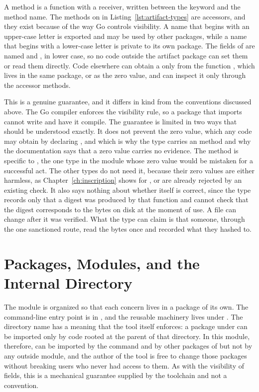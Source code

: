 A method is a function with a receiver, written between the keyword  and the method name. The methods on  in Listing~\ref{lst:artifact-types} are accessors, and they exist because of the way Go controls visibility. A name that begins with an upper-case letter is exported and may be used by other packages, while a name that begins with a lower-case letter is private to its own package. The fields of  are named  and , in lower case, so no code outside the artifact package can set them or read them directly. Code elsewhere can obtain a  only from the function , which lives in the same package, or as the zero value, and can inspect it only through the accessor methods.

This is a genuine guarantee, and it differs in kind from the conventions discussed above. The Go compiler enforces the visibility rule, so a package that imports  cannot write  and have it compile. The guarantee is limited in two ways that should be understood exactly. It does not prevent the zero value, which any code may obtain by declaring , and which is why the type carries an  method and why the documentation says that a zero value carries no evidence. The method is specific to , the one type in the module whose zero value would be mistaken for a successful act. The other types do not need it, because their zero values are either harmless, as Chapter~\ref{ch:inscription} shows for , or are already rejected by an existing check. It also says nothing about whether  itself is correct, since the type records only that a digest was produced by that function and cannot check that the digest corresponds to the bytes on disk at the moment of use. A file can change after it was verified. What the type can claim is that someone, through the one sanctioned route, read the bytes once and recorded what they hashed to.

\section{Packages, Modules, and the Internal Directory}

The \golab{} module is organized so that each concern lives in a package of its own. The command-line entry point is in , and the reusable machinery lives under . The directory name  has a meaning that the  tool itself enforces: a package under  can be imported only by code rooted at the parent of that directory. In this module, therefore,  can be imported by the command and by other packages of \golab{} but not by any outside module, and the author of the tool is free to change those packages without breaking users who never had access to them. As with the visibility of fields, this is a mechanical guarantee supplied by the toolchain and not a convention.

